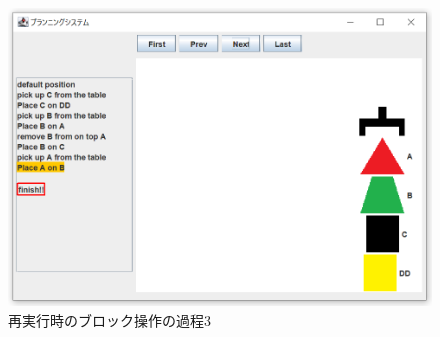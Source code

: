 \documentclass[uplatex,12pt]{jsarticle}
\begin{document}
\begin{figure}[htbp]
  \begin{center}
    \includegraphics[scale=0.6]{images/page12.PNG}
    \caption{再実行時のブロック操作の過程3}
    \label{fig:page12}
  \end{center}
\end{figure}
\end{document}
